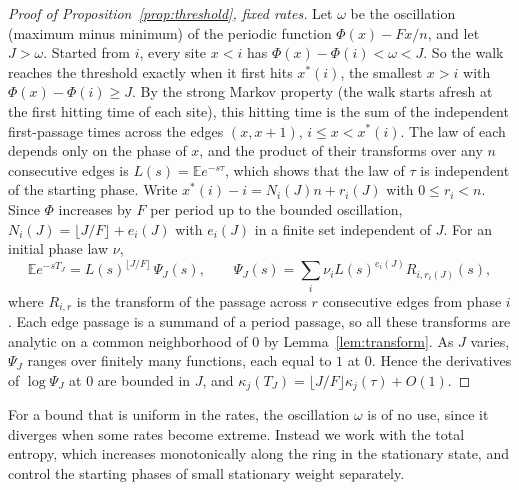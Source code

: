 \documentclass[11pt]{article}
\theoremstyle{remark}
\newcommand{\E}{\mathbb E}
\begin{document}
\begin{proof}[Proof of Proposition~\ref{prop:threshold}, fixed rates]
Let $\omega$ be the oscillation (maximum minus minimum) of the periodic
function $\Phi(x)-Fx/n$, and let $J>\omega$. Started from $i$, every site
$x<i$ has $\Phi(x)-\Phi(i)<\omega<J$. So the walk reaches the threshold
exactly when it first hits $x^*(i)$, the smallest $x>i$ with
$\Phi(x)-\Phi(i)\ge J$. By the strong Markov property (the walk starts
afresh at the first hitting time of each site), this hitting time is the
sum of the independent first-passage times across the edges $(x,x+1)$,
$i\le x<x^*(i)$. The law of each depends only on the phase of $x$, and the
product of their transforms over any $n$ consecutive edges is
$L(s)=\E e^{-s\tau}$, which shows that the law of $\tau$ is independent of
the starting phase. Write $x^*(i)-i=N_i(J)n+r_i(J)$ with $0\le r_i<n$.
Since $\Phi$ increases by $F$ per period up to the bounded oscillation,
$N_i(J)=\lfloor J/F\rfloor+e_i(J)$ with $e_i(J)$ in a finite set
independent of $J$. For an initial phase law $\nu$,
\[
\E e^{-sT_J}=L(s)^{\lfloor J/F\rfloor}\,\Psi_J(s),\qquad
\Psi_J(s)=\sum_i\nu_iL(s)^{e_i(J)}R_{i,r_i(J)}(s),
\]
where $R_{i,r}$ is the transform of the passage across $r$ consecutive edges
from phase $i$. Each edge passage is a summand of a period passage, so all
these transforms are analytic on a common neighborhood of $0$ by
Lemma~\ref{lem:transform}. As $J$ varies, $\Psi_J$ ranges over finitely many
functions, each equal to $1$ at $0$. Hence the derivatives of
$\log\Psi_J$ at $0$ are bounded in $J$, and
$\kappa_j(T_J)=\lfloor J/F\rfloor\kappa_j(\tau)+O(1)$.
\end{proof}

For a bound that is uniform in the rates, the oscillation $\omega$ is of no
use, since it diverges when some rates become extreme. Instead we work with
the total entropy, which increases monotonically along the ring in the
stationary state, and control the starting phases of small stationary
weight separately.
\end{document}
